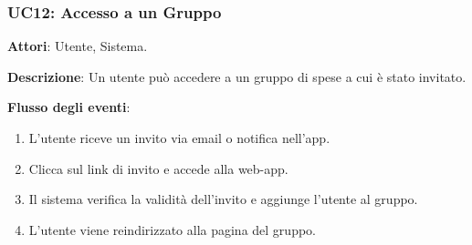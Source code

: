 \subsubsection{UC12: Accesso a un Gruppo}
\textbf{Attori}: Utente, Sistema.

\textbf{Descrizione}: Un utente può accedere a un gruppo di spese a cui è stato invitato.

\textbf{Flusso degli eventi}:
\begin{enumerate}
    \item L'utente riceve un invito via email o notifica nell’app.
    \item Clicca sul link di invito e accede alla web-app.
    \item Il sistema verifica la validità dell’invito e aggiunge l’utente al gruppo.
    \item L'utente viene reindirizzato alla pagina del gruppo.
\end{enumerate}